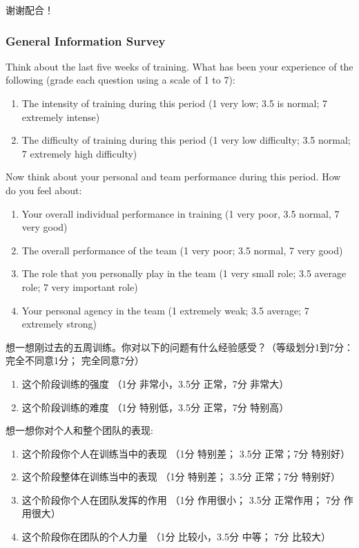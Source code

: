 \begin{CJK}{UTF8}{gbsn}
  谢谢配合！





      \subsubsection{General Information Survey \label{sect:generalSurvey}}


Think about the last five weeks of training.  What has been your experience of the following (grade each question using a scale of 1 to 7):

\begin{enumerate}
\item The intensity of training during this period (1 very low; 3.5 is normal; 7 extremely intense)
\item The difficulty of training during this period (1 very low difficulty; 3.5 normal; 7 extremely high difficulty)
\end{enumerate}

Now think about your personal and team performance during this period.  How do you feel about:

\begin{enumerate}
\item Your overall individual performance in training (1 very poor, 3.5 normal, 7 very good)
\item The overall performance of the team (1 very poor; 3.5 normal, 7 very good)
\item The role that you personally play in the team (1 very small role; 3.5 average role; 7 very important role)
\item  Your personal agency in the team (1 extremely weak;  3.5 average; 7 extremely strong)
\end{enumerate}


想一想刚过去的五周训练。你对以下的问题有什么经验感受？（等级划分1到7分：完全不同意1分； 完全同意7分）
\begin{enumerate}
\item 这个阶段训练的强度 （1分 非常小，3.5分 正常，7分 非常大）
\item 这个阶段训练的难度 （1分 特别低，3.5分 正常，7分 特别高）
\end{enumerate}

想一想你对个人和整个团队的表现:

\begin{enumerate}
\item 这个阶段你个人在训练当中的表现 （1分 特别差； 3.5分 正常；7分 特别好）
\item 这个阶段整体在训练当中的表现 （1分 特别差； 3.5分 正常；7分 特别好）
\item 这个阶段你个人在团队发挥的作用 （1分 作用很小； 3.5分 正常作用； 7分 作用很大）
\item 这个阶段你在团队的个人力量 （1分 比较小，3.5分 中等； 7分 比较大）
\end{enumerate}








                                                        \end{CJK}
